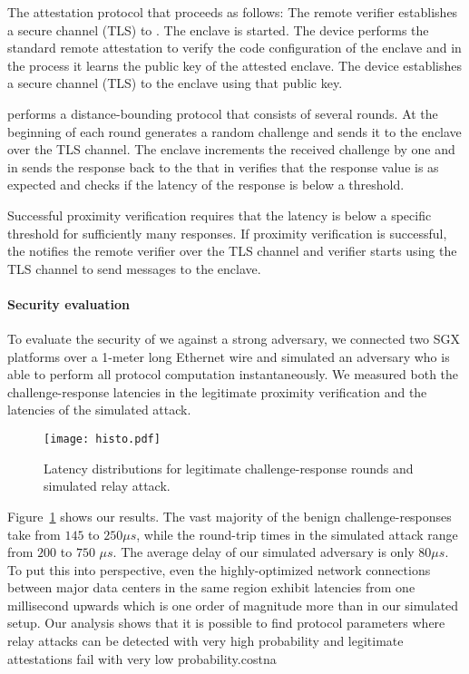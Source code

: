 The \proximitee attestation protocol that proceeds as follows: \one The remote verifier establishes a secure channel (TLS) to \key. \two The enclave is started. \three The \key device performs the standard remote attestation to verify the code configuration of the enclave and in the process it learns the public key of the attested enclave. \four The \key device establishes a secure channel (TLS) to the enclave using that public key. 

\five \key performs a distance-bounding protocol that consists of several rounds. At the beginning of each round \key generates a random challenge and sends it to the enclave over the TLS channel. \six The enclave increments the received challenge by one and in \seven sends the response back to the \key that in \eight verifies that the response value is as expected and checks if the latency of the response is below a threshold. 

\nine Successful proximity verification requires that the latency is below a specific threshold for sufficiently many responses. If proximity verification is successful, the \key notifies the remote verifier over the TLS channel and verifier starts using the \key TLS channel to send messages to the enclave.

\paragraph{Security evaluation}
To evaluate the security of \proximitee we against a strong adversary, we connected two SGX platforms over a 1-meter long Ethernet wire and simulated an adversary who is able to perform all protocol computation instantaneously. We measured both the challenge-response latencies in the legitimate proximity verification and the latencies of the simulated attack. 

\begin{figure}[t]
  \centering
    \texttt{[image: histo.pdf]} 
    \caption{Latency distributions for legitimate challenge-response rounds and simulated relay attack.}
    \label{graph:histogram}
\end{figure}


Figure~\ref{graph:histogram} shows our results. The vast majority of the benign challenge-responses take from $145$ to $250 \mu s$, while the round-trip times in the simulated attack range from $200$ to $750$ $\mu s$. The average delay of our simulated adversary is only $80 \mu s$. To put this into perspective, even the highly-optimized network connections between major data centers in the same region exhibit latencies from one millisecond upwards which is one order of magnitude more than in our simulated setup. Our analysis shows that it is possible to find protocol parameters where relay attacks can be detected with very high probability and legitimate attestations fail with very low probability.costna

